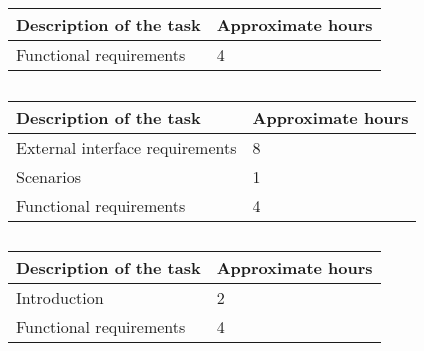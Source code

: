 
%

\subsection{}
\begin{table}[h!]
\begin{tabular}{|l|l|}
\hline
\textbf{Description of the task} & \textbf{Approximate hours} \\ \hline
Functional requirements & 4 \\ \hline
\end{tabular}
\end{table}

\subsection{}
\begin{table}[h!]
\begin{tabular}{|l|l|}
\hline
\textbf{Description of the task} & \textbf{Approximate hours} \\ \hline
External interface requirements & 8 \\ \hline
Scenarios & 1 \\ \hline
Functional requirements & 4 \\ \hline
\end{tabular}
\end{table}

\subsection{}
\begin{table}[h!]
\begin{tabular}{|l|l|}
\hline
\textbf{Description of the task} & \textbf{Approximate hours} \\ \hline
Introduction & 2 \\ \hline
Functional requirements & 4 \\ \hline
\end{tabular}
\end{table}

%
